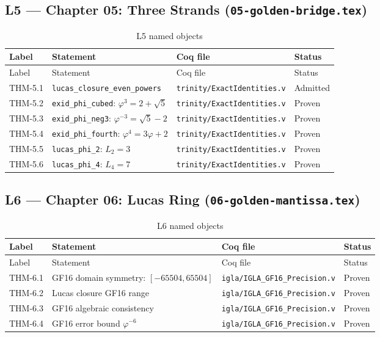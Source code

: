 \subsection{L5 — Chapter 05: Three Strands (\texttt{05-golden-bridge.tex})}
\label{sec:A-L5}

\begin{longtable}{lp{6cm}ll}
\toprule
Label & Statement & Coq file & Status \\
\midrule
\endfirsthead
\toprule
Label & Statement & Coq file & Status \\
\midrule
\endhead
\bottomrule
\endfoot
\bottomrule
\caption{L5 named objects}
\endlastfoot
THM-5.1 & \texttt{lucas\_closure\_even\_powers} &
  \texttt{trinity/ExactIdentities.v} & Admitted \\
THM-5.2 & \texttt{exid\_phi\_cubed}: $\varphi^{3}=2+\sqrt{5}$ &
  \texttt{trinity/ExactIdentities.v} & Proven \\
THM-5.3 & \texttt{exid\_phi\_neg3}: $\varphi^{-3}=\sqrt{5}-2$ &
  \texttt{trinity/ExactIdentities.v} & Proven \\
THM-5.4 & \texttt{exid\_phi\_fourth}: $\varphi^{4}=3\varphi+2$ &
  \texttt{trinity/ExactIdentities.v} & Proven \\
THM-5.5 & \texttt{lucas\_phi\_2}: $L_2=3$ &
  \texttt{trinity/ExactIdentities.v} & Proven \\
THM-5.6 & \texttt{lucas\_phi\_4}: $L_4=7$ &
  \texttt{trinity/ExactIdentities.v} & Proven \\
\end{longtable}

\subsection{L6 — Chapter 06: Lucas Ring (\texttt{06-golden-mantissa.tex})}
\label{sec:A-L6}

\begin{longtable}{lp{6cm}ll}
\toprule
Label & Statement & Coq file & Status \\
\midrule
\endfirsthead
\toprule
Label & Statement & Coq file & Status \\
\midrule
\endhead
\bottomrule
\endfoot
\bottomrule
\caption{L6 named objects}
\endlastfoot
THM-6.1 & GF16 domain symmetry: $[-65504, 65504]$ &
  \texttt{igla/IGLA\_GF16\_Precision.v} & Proven \\
THM-6.2 & Lucas closure GF16 range &
  \texttt{igla/IGLA\_GF16\_Precision.v} & Proven \\
THM-6.3 & GF16 algebraic consistency &
  \texttt{igla/IGLA\_GF16\_Precision.v} & Proven \\
THM-6.4 & GF16 error bound $\varphi^{-6}$ &
  \texttt{igla/IGLA\_GF16\_Precision.v} & Proven \\
\end{longtable}

